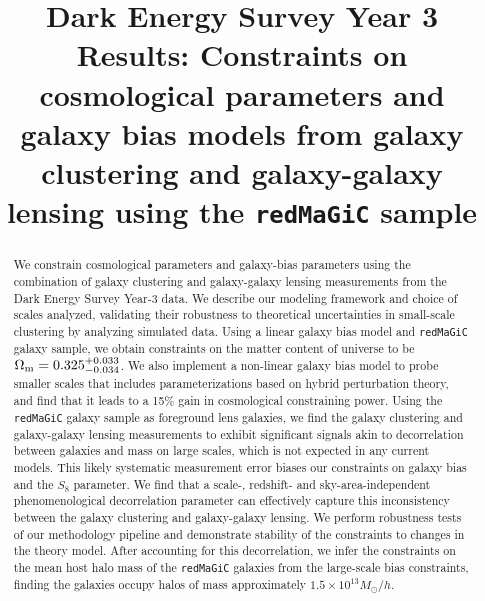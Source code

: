\documentclass[aps, prd,twocolumn,superscriptaddress,nofootinbib,preprintnumbers]{revtex4-1}
\newcommand{\redmagic}{\texttt{redMaGiC} }
\begin{document}
\title[Short title, max. 45 characters]{Dark Energy Survey Year 3 Results: Constraints on cosmological parameters and galaxy bias models from galaxy clustering and galaxy-galaxy lensing using the \redmagic sample}


\label{firstpage}


\begin{abstract}
We constrain cosmological parameters and galaxy-bias parameters using the combination of galaxy clustering and galaxy-galaxy lensing measurements from the Dark Energy Survey Year-3 data. We describe our modeling framework and choice of scales analyzed, validating their robustness to theoretical uncertainties in small-scale clustering by analyzing simulated data. Using a linear galaxy bias model and \redmagic galaxy sample, we obtain constraints on the matter content of universe to be $\Omega_{\rm m} = 0.325^{+0.033}_{-0.034}$. We also implement a non-linear galaxy bias model to probe smaller scales that includes parameterizations based on hybrid perturbation theory, and find that it leads to a 15\% gain in cosmological constraining power. Using the \redmagic galaxy sample as foreground lens galaxies, we find the galaxy clustering and galaxy-galaxy lensing measurements to exhibit significant signals akin to decorrelation between galaxies and mass on large scales, which is not expected in any current models. This likely systematic measurement error biases our constraints on galaxy bias and the $S_8$ parameter. We find that a scale-, redshift- and sky-area-independent phenomenological decorrelation parameter can effectively capture this inconsistency between the galaxy clustering and galaxy-galaxy lensing. We perform robustness tests of our methodology pipeline and demonstrate stability of the constraints to changes in the theory model. After accounting for this decorrelation, we infer the constraints on the mean host halo mass of the \redmagic galaxies from the large-scale bias constraints, finding the galaxies occupy halos of mass approximately $1.5 \times 10^{13} M_{\odot}/h$. 
\end{abstract}



\end{document}
